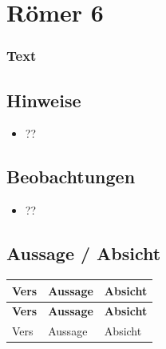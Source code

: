 \section{Römer 6}
\subsubsection{Text}

\subsection{Hinweise}
\begin{itemize}
    \item ??
\end{itemize}

\subsection{Beobachtungen}
\begin{itemize}
    \item ??
\end{itemize}

\subsection{Aussage / Absicht}
\begin{longtable}{l p{10cm} p{10cm}}
    \hline
    \textbf{Vers} &	\textbf{Aussage} & \textbf{Absicht} \\
    \hline
    \endfirsthead
    \hline
    \textbf{Vers} &	\textbf{Aussage} & \textbf{Absicht} \\
    \hline
    \endhead
    Vers & Aussage & Absicht \\
    \hline
\end{longtable}